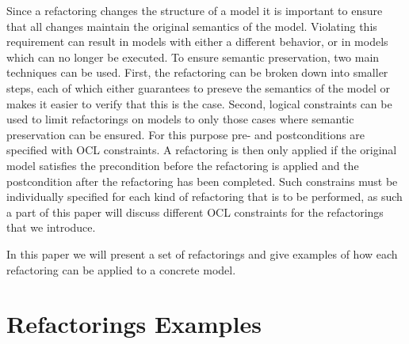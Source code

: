 \documentclass{llncs}
\begin{document}
Since a refactoring changes the structure of a model it is important to ensure that all changes maintain the original semantics of the
model. Violating this requirement can result in models with either a different behavior, or in models which can no longer be executed.
To ensure semantic preservation, two main techniques can be used. First, the refactoring can be broken down into smaller steps, each of
which either guarantees to preseve the semantics of the model or makes it easier to verify that this is the case. Second, logical
constraints can be used to limit refactorings on models to only those cases where semantic preservation can be ensured. For this
purpose pre- and postconditions are specified with OCL constraints. A refactoring is then only applied if the original model satisfies
the precondition before the refactoring is applied and the postcondition after the refactoring has been completed. Such constrains must
be individually specified for each kind of refactoring that is to be performed, as such a part of this paper will discuss different OCL
constraints for the refactorings that we introduce.


In this paper we will present a set of refactorings and give examples of how each refactoring can be applied to a concrete model. 


\section{Refactorings Examples}
\label{refactoring-examples}
\end{document}
